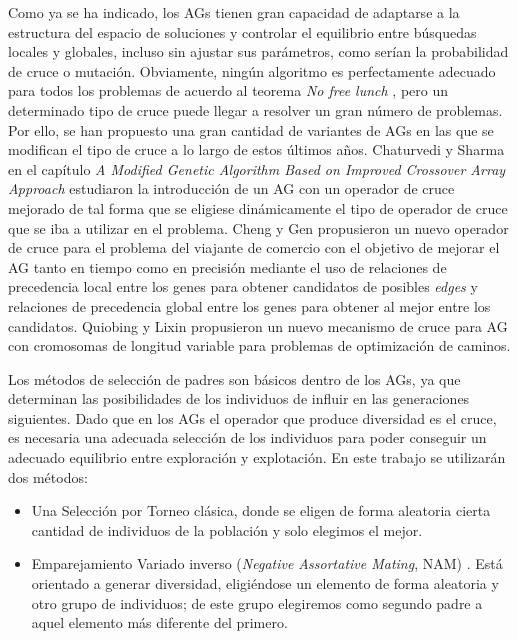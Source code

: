 Como ya se ha indicado, los AGs tienen gran capacidad de adaptarse a la estructura del espacio de soluciones y controlar el equilibrio entre búsquedas locales y globales, incluso sin ajustar sus parámetros, como serían la probabilidad de cruce o mutación. 
Obviamente, ningún algoritmo es perfectamente adecuado para todos los problemas de acuerdo al teorema \textit{No free lunch} \parencite{wolpertNoFreeLunch1997}, pero un determinado tipo de cruce puede llegar a resolver un gran número de problemas. 
Por ello, se han propuesto una gran cantidad de variantes de AGs en las que se modifican el tipo de cruce a lo largo de estos últimos años. 
Chaturvedi y Sharma en el capítulo \textit{A Modified Genetic Algorithm Based on Improved Crossover Array Approach} \parencite{chaturvediModifiedGeneticAlgorithm2019} estudiaron la introducción de un AG con un operador de cruce mejorado de tal forma que se eligiese dinámicamente el tipo de operador de cruce que se iba a utilizar en el problema. 
Cheng y Gen \parencite{chengCrossoverIntensiveSearch1994} propusieron un nuevo operador de cruce para el problema del viajante de comercio con el objetivo de mejorar el AG tanto en tiempo como en precisión mediante el uso de relaciones de precedencia local entre los genes para obtener candidatos de posibles \textit{edges} y relaciones de precedencia global entre los genes para obtener al mejor entre los candidatos. 
Quiobing y Lixin \parencite{qiongbingNewCrossoverMechanism2016} propusieron un nuevo mecanismo de cruce para AG con cromosomas de longitud variable para problemas de optimización de caminos. 


Los métodos de selección de padres son básicos dentro de los AGs, ya que determinan las posibilidades de los individuos de influir en las generaciones siguientes. 
Dado que en los AGs el operador que produce diversidad es el cruce, es necesaria una adecuada selección de los individuos para poder conseguir un adecuado equilibrio entre exploración y explotación. 
En este trabajo se utilizarán dos métodos:
\begin{itemize}
	\item Una Selección por Torneo clásica, donde se eligen de forma aleatoria cierta cantidad de individuos de la población y solo elegimos el mejor. 
	\item Emparejamiento Variado inverso (\textit{Negative Assortative Mating}, NAM) \parencite{fernandesStudyNonrandomMating2001}. 
	Está orientado a generar diversidad, eligiéndose un elemento de forma aleatoria y otro grupo de individuos; de este grupo elegiremos como segundo padre a aquel elemento más diferente del primero. 
\end{itemize}

